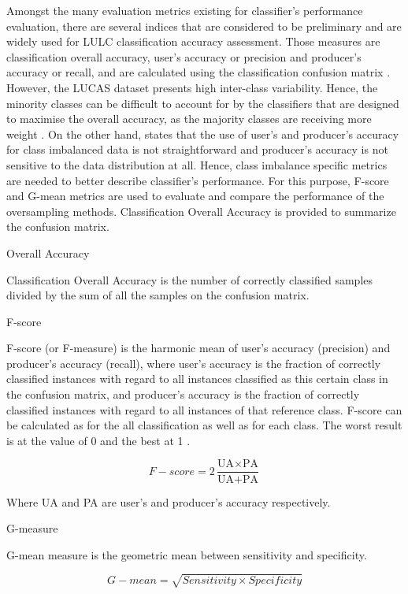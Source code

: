 \documentclass[parskip=full]{scrartcl}
\begin{document}
Amongst the many evaluation metrics existing for classifier's performance
evaluation, there are several indices that are considered to be preliminary and
are widely used for LULC classification accuracy assessment. Those measures are
classification overall accuracy, user's accuracy or precision and 
producer's accuracy or recall,  and are calculated using the classification
confusion matrix \cite{Liu2007}. However, the LUCAS dataset presents high
inter-class variability. Hence, the minority classes can be difficult to
account for by the classifiers that are designed to maximise the overall
accuracy, as the majority classes are receiving more weight \cite{Inglada2017}.
On the other hand, \cite{He2008} states that the use of user's and producer's 
accuracy for class imbalanced data is not straightforward and producer's 
accuracy is not sensitive to the data distribution at all. Hence, class 
imbalance specific metrics are needed to better describe classifier's 
performance. For this purpose, F-score and G-mean metrics are used to evaluate 
and compare the performance of the oversampling methods. Classification Overall 
Accuracy is provided to summarize the confusion matrix.


Overall Accuracy

Classification Overall Accuracy is the number of correctly classified samples 
divided by the sum of all the samples on the confusion matrix.  

F-score

F-score (or F-measure) is the harmonic mean of user's accuracy (precision) and 
producer's accuracy (recall), where user's accuracy is the fraction of correctly
classified instances with regard to all instances classified as this certain
class in the confusion matrix, and producer's accuracy is the fraction of 
correctly classified instances with regard to all instances of that reference 
class. F-score can be calculated as for the all classification as well as for 
each class. The worst result is at the value of 0 and the best at 1 
\cite{Inglada2017}.

\[
F{-}score=2\frac{\text{UA} \times \text{PA}}{\text{UA} + \text{PA}}
\]

Where UA and PA are user's and producer's accuracy respectively.

G-measure

G-mean measure is the geometric mean between sensitivity and specificity. 

\[G{-}mean = \sqrt{Sensitivity \times Specificity}\]
\end{document}
